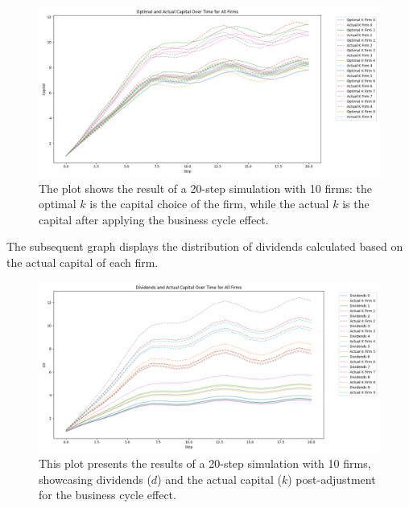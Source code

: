 \documentclass[12pt]{article}
\begin{document}
\begin{figure}[ht]
    \centering
    \includegraphics[scale=0.5]{OptimalK_noexit.png}
    \caption{The plot shows the result of a 20-step simulation with 10 firms: the optimal \(k \) is the capital choice of the firm, while the actual \(k\) is the capital after applying the business cycle effect.}
    \label{fig:optKnoE}
\end{figure}

The subsequent graph displays the distribution of dividends calculated based on the actual capital of each firm.
\begin{figure}[ht]
    \centering
    \includegraphics[scale=0.5]{div_cap_noexit.png}
    \caption{This plot presents the results of a 20-step simulation with 10 firms, showcasing dividends (\(d \)) and the actual capital (\(k \)) post-adjustment for the business cycle effect.}
    \label{fig:divNoExit}
\end{figure}
\end{document}
